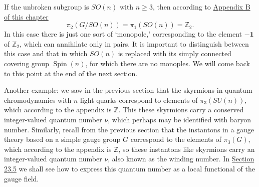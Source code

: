 If the unbroken subgroup is $SO(n)$ with $n\geq3$, then according to
\hyperref[app:23.B]{Appendix B of this chapter}
\begin{equation}
 \pi_2(G/SO(n))=\pi_1(SO(n))=\mathbb Z_2.
 \tag{23.2.9}\label{eq:23.2.9}
\end{equation}
In this case there is just one sort of `monopole,' corresponding to the
element $-\mathbf{1}$ of $\mathbb Z_2$, which can annihilate only in
pairs. It is important to distinguish between this case and that in which
$SO(n)$ is replaced with its simply connected covering group
$\operatorname{Spin}(n)$, for which there are no monoples. We will come
back to this point at the end of the next section.

Another example: we saw in the previous section that the skyrmions in
quantum chromodynamics with $n$ light quarks correspond to elements of
$\pi_3(SU(n))$, which according to the appendix is $\mathbb Z$. This
these skyrmions carry a conserved integer-valued quantum number $\nu$,
which perhaps may be identified with baryon number. Similarly, recall
from the previous section that the instantons in a gauge theory based on
a simple gauge group $G$ correspond to the elements of $\pi_3(G)$, which
according to the appendix is $\mathbb Z$, so these instantons like
skyrmions carry an integer-valued quantum number $\nu$, also known as the
winding number. In \hyperref[sec:23.5]{Section 23.5} we shall see how to
express this quantum number as a local functional of the gauge field.
